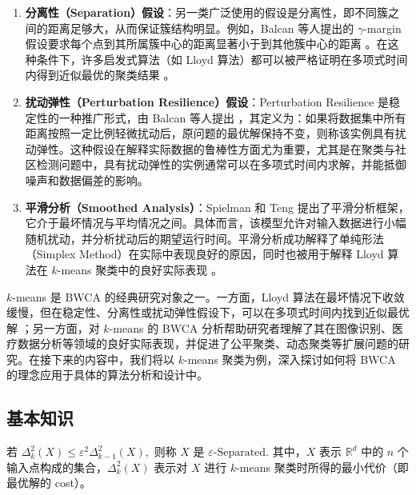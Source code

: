 \documentclass[lang=cn,newtx,10pt,scheme=chinese,chinesefont=nofont,citestyle=gb7714-2015, bibstyle=gb7714-2015]{elegantbook}
\begin{document}
\begin{refsection}
\begin{enumerate}
    \item \textbf{分离性（Separation）假设}：另一类广泛使用的假设是分离性，即不同簇之间的距离足够大，从而保证簇结构明显。例如，Balcan 等人提出的 $\gamma$-margin 假设要求每个点到其所属簇中心的距离显著小于到其他簇中心的距离 \cite{balcan2013clustering}。在这种条件下，许多启发式算法（如 Lloyd 算法）都可以被严格证明在多项式时间内得到近似最优的聚类结果 \cite{ostrovsky2012effectiveness}。

    \item \textbf{扰动弹性（Perturbation Resilience）假设}：Perturbation Resilience 是稳定性的一种推广形式，由 Balcan 等人提出 \cite{balcan2009perturbation}，其定义为：如果将数据集中所有距离按照一定比例轻微扰动后，原问题的最优解保持不变，则称该实例具有扰动弹性。这种假设在解释实际数据的鲁棒性方面尤为重要，尤其是在聚类与社区检测问题中，具有扰动弹性的实例通常可以在多项式时间内求解，并能抵御噪声和数据偏差的影响。

    \item \textbf{平滑分析（Smoothed Analysis）}：Spielman 和 Teng \cite{spielman2004smoothed} 提出了平滑分析框架，它介于最坏情况与平均情况之间。具体而言，该模型允许对输入数据进行小幅随机扰动，并分析扰动后的期望运行时间。平滑分析成功解释了单纯形法（Simplex Method）在实际中表现良好的原因，同时也被用于解释 Lloyd 算法在 $k$-means 聚类中的良好实际表现 \cite{arthur2006kmeans}。
\end{enumerate}

$k$-means 是 BWCA 的经典研究对象之一。一方面，Lloyd 算法在最坏情况下收敛缓慢，但在稳定性、分离性或扰动弹性假设下，可以在多项式时间内找到近似最优解 \cite{awasthi2012stability, ostrovsky2012effectiveness, balcan2009perturbation}；另一方面，对 $k$-means 的 BWCA 分析帮助研究者理解了其在图像识别、医疗数据分析等领域的良好实际表现，并促进了公平聚类、动态聚类等扩展问题的研究。在接下来的内容中，我们将以 $k$-means 聚类为例，深入探讨如何将 BWCA 的理念应用于具体的算法分析和设计中。


\subsection{基本知识}

\begin{definition}
    $\text{若 } \Delta_k^2(X) \leq \varepsilon^2 \Delta_{k-1}^2(X), \text{ 则称 } X \text{ 是 } \varepsilon\text{-Separated}.$ 其中，$X$ 表示 $\mathbb{R}^d$ 中的 $n$ 个输入点构成的集合，$\Delta_k^2(X)$ 表示对 $X$ 进行 $k$-means 聚类时所得的最小代价（即最优解的 cost）\cite{ostrovsky2013effectiveness}。
\end{definition}


\end{refsection}
\end{document}
